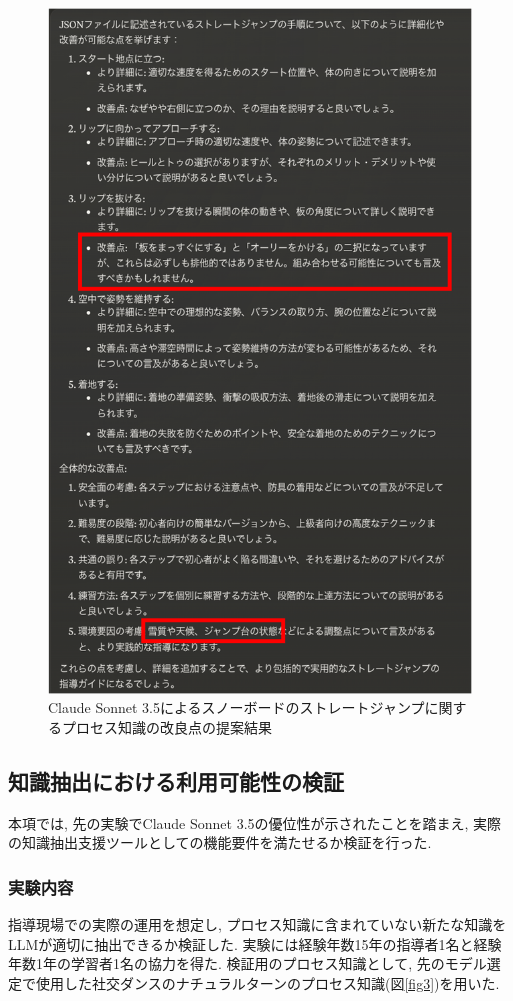 \begin{figure}[htbp]
    \centering
    \includegraphics[width=0.84\linewidth]{./image/straight_jump_improvement_sonnet_2.png}
    \caption{Claude Sonnet 3.5によるスノーボードのストレートジャンプに関するプロセス知識の改良点の提案結果}
    \label{fig12}
\end{figure}

\clearpage

\subsection{知識抽出における利用可能性の検証}
本項では, 先の実験でClaude Sonnet 3.5の優位性が示されたことを踏まえ, 実際の知識抽出支援ツールとしての機能要件を満たせるか検証を行った.

\subsubsection{実験内容}
指導現場での実際の運用を想定し, プロセス知識に含まれていない新たな知識をLLMが適切に抽出できるか検証した. 実験には経験年数15年の指導者1名と経験年数1年の学習者1名の協力を得た. 検証用のプロセス知識として, 先のモデル選定で使用した社交ダンスのナチュラルターンのプロセス知識(図\ref{fig3})を用いた.

